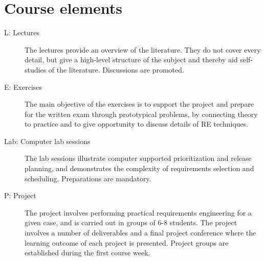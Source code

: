 \documentclass{program}
\begin{document}
\newpage

\section{Course elements}
\begin{description}
\item[L: Lectures] The lectures provide an overview of the literature. They do not cover every detail, but give a high-level structure of the subject and thereby aid self-studies of the literature. Discussions are promoted.
\item[E: Exercises] The main objective of the exercises is to support the project and prepare for the written exam through prototypical problems, by connecting theory to practice and to give opportunity to discuss details of RE techniques.
\item[Lab: Computer lab sessions] The lab sessions illustrate computer supported
prioritization and release planning, and demonstrates the complexity of requirements selection and scheduling. Preparations are mandatory. %
\item[P: Project] The project involves performing practical requirements engineering for a given case, and is carried out in groups of 6-8 students. The project involves a number of deliverables and a final project conference where the learning outcome of each project is presented. Project groups are established during the first course week.

\end{description}
\end{document}
